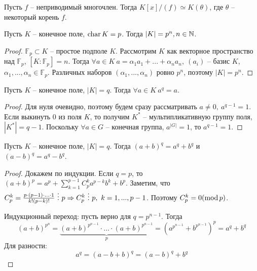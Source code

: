 \begin{Thm}
	Пусть $f$ -- неприводимый многочлен. Тогда $K[x] / (f) \simeq K(\theta)$, где $\theta$ -- некоторый корень $f$.  
\end{Thm}


\begin{Thm}
	Пусть $K$ -- конечное поле, $\operatorname{char} K = p$. Тогда $|K| = p^n, n \in \mathbb{N}$.
\end{Thm}

\begin{proof}
	$\mathbb{F}_p \subset K$ -- простое подполе $K$. Рассмотрим $K$ как векторное пространство над $\mathbb{F}_p$, $[K : \mathbb{F}_p] = n$.
	Тогда $\forall a \in K \ a = \alpha_1 a_1 + ... + \alpha_n a_n, \ (a_i)$ -- базис $K$, $\alpha_1, ..., \alpha_n \in \mathbb{F}_p$. Различных наборов $(\alpha_1, ..., \alpha_n)$ ровно $p^n$, поэтому $|K| = p^n$.  
\end{proof}

\begin{Lm}
	Пусть $K$ -- конечное поле, $|K| = q$. Тогда $\forall a \in K \ a^q = a$.
\end{Lm}

\begin{proof}
	Для нуля очевидно, поэтому будем сразу рассматривать $a \neq 0, \ a^{q - 1} = 1$.
	Если выкинуть 0 из поля $K$, то получим $K^*$ -- мультипликативную группу поля, $|K^*| = q - 1$.
	Поскольку $\forall a \in G$ -- конечная группа, $a^{|G|} = 1$, то $a^{q - 1} = 1$.  
\end{proof}

\begin{Lm}
	Пусть $K$ -- конечное поле, $|K| = q$. Тогда $(a + b)^q = a^q + b^q$ и $(a - b)^q = a^q - b^q$.  
\end{Lm}

\begin{proof}
	Докажем по индукции. Если $q = p$, то $(a + b)^p = a^p + \sum_{k = 1}^{p - 1} C_p^k a^{p - k}b^k + b^p$.
	Заметим, что $C_p^k = \frac{p \cdot (p - 1) \cdot ... \cdot 1}{k!(p - k)!} \ \vdots \ p \Rightarrow C_p^k \ \vdots \ p, \ k = 1, ..., p - 1$.
	Поэтому $C_p^k = 0 (\mathrm{mod}\, p)$.
	
	Индукционный переход: пусть верно для $q = p^{n - 1}$. Тогда
	\[(a + b)^{p^n} = \underbrace{(a+b)^{p^{n - 1}} \cdot ... \cdot (a+b)^{p^{n - 1}}}_p = \left(a^{p^{n - 1}} + b^{p^{n - 1}}\right)^p = a^q + b^q\]
	Для разности: 
	\[a^q = (a - b + b)^q = (a - b)^q + b^q\] 
\end{proof}

